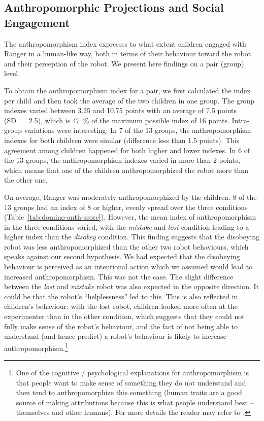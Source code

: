 \documentclass{sig-alternate}
\begin{document}
\subsection{Anthropomorphic Projections and Social Engagement}

The anthropomorphism index expresses to what extent children engaged with Ranger
in a human-like way, both in terms of their behaviour toward the robot and their
perception of the robot. We present here findings on a pair (group) level.

To obtain the anthropomorphism index for a pair, we first calculated the index
per child and then took the average of the two children in one group.  The group
indexes varied between 3.25 and 10.75 points with an average of 7.5 points
(SD~=~2.5), which is 47~\% of the maximum possible index of 16 points.
Intra-group variations were interesting: In 7 of the 13 groups, the
anthropomorphism indexes for both children were similar (difference less than
1.5 points). This agreement among children happened for both higher and lower
indexes. In 6 of the 13 groups, the anthropomorphism indexes varied in more than
2 points, which means that one of the children anthropomorphized the robot more
than the other one.

On average, Ranger was moderately anthropomorphized by the children. 8 of the 13
groups had an index of 8 or higher, evenly spread over the three conditions
(Table~\ref{tab:domino-anth-score}). However, the mean index of anthropomorphism
in the three conditions varied, with the \textit{mistake} and \textit{lost}
condition leading to a higher index than the \textit{disobey} condition. This
finding suggests that the disobeying robot was less anthropomorphized than the
other two robot behaviours, which speaks against our second hypothesis. We had
expected that the disobeying behaviour is perceived as an intentional action
which we assumed would lead to increased anthropomorphism. This was not the
case. The slight difference between the \textit{lost} and \textit{mistake} robot
was also expected in the opposite direction. It could be that the robot's
``helplessness'' led to this. This is also reflected in children's behaviour:
with the lost robot, children looked more often at the experimenter than in the
other condition, which suggests that they could not fully make sense of the
robot's behaviour, and the fact of not being able to understand (and hence
predict) a robot's behaviour is likely to increase
anthropomorphism.\footnote{One of the cognitive / psychological explanations for
anthropomorphism is that people want to make sense of something they do not
understand and then tend to anthropomorphize this something (human traits
are a good source of making attributions because this is what people
understand best -- themselves and other humans). For more details the reader may
refer to \cite{epley_seeing_2007}.}
\end{document}
